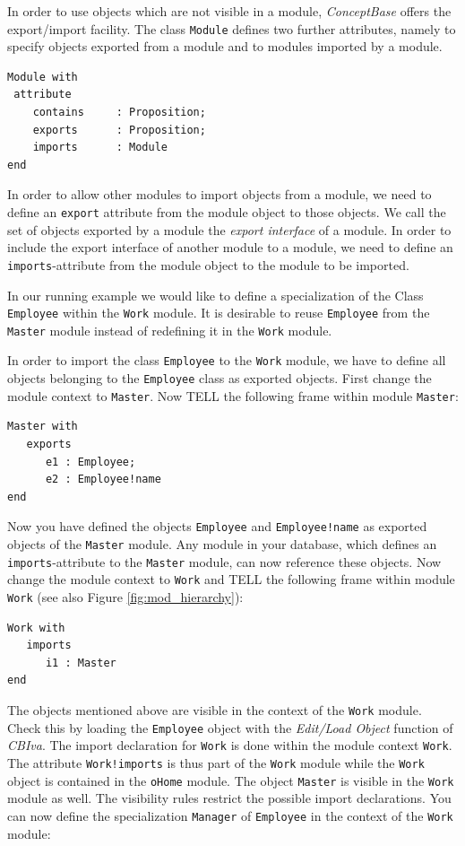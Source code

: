 In order to use objects which are not visible in a module, {\em ConceptBase} offers the
export/import facility.
The class {\tt Module} defines two further attributes, namely to specify objects exported from
a module and to modules imported by a module.

\begin{verbatim}
Module with
 attribute
    contains     : Proposition;
    exports      : Proposition;
    imports      : Module
end
\end{verbatim}

In order to allow other modules to import objects from a module, we need to define an {\tt export} attribute from the module object
to those objects. We call the set of
objects exported by a module the {\em export interface} of a module.
In order to include the export interface of another module to a module, we need to define
an {\tt imports}-attribute from the module object to the module to be imported.


In our running example we would like to define a specialization of the Class {\tt Employee} within
the  {\tt Work} module. It is desirable to reuse   {\tt Employee} from the
{\tt Master} module instead of redefining it in the  {\tt Work} module.

In order to import the class {\tt Employee} to the {\tt Work} module, we have to
define all objects belonging to the {\tt Employee} class as exported objects.
First change the module context to {\tt Master}. Now TELL the following frame
within module {\tt Master}:

\begin{verbatim}
Master with
   exports
      e1 : Employee;
      e2 : Employee!name
end
\end{verbatim}

Now you have defined the  objects {\tt Employee} and {\tt Employee!name}
as exported objects of the {\tt Master} module.
Any module in your database, which defines an {\tt imports}-attribute to the
{\tt Master} module, can now reference these  objects.
Now change the module context to {\tt Work} and TELL the following frame within
module {\tt Work} (see also Figure \ref{fig:mod_hierarchy}):

\begin{verbatim}
Work with
   imports
      i1 : Master
end
\end{verbatim}

The  objects mentioned above are visible in the context of the {\tt Work}
module. Check this by loading the {\tt Employee} object with the {\em Edit/Load Object} function
of {\em CBIva}.
The import declaration for {\tt Work} is done within the module context
{\tt Work}. The attribute {\tt Work!imports} is thus part of the {\tt Work}
module while the {\tt Work}  object is contained in the {\tt oHome} module.
The object {\tt Master} is visible in the {\tt Work} module as well.
The visibility rules restrict the possible import declarations. 
You can now define the specialization {\tt Manager} of {\tt Employee}  in the
context of the {\tt Work} module:


